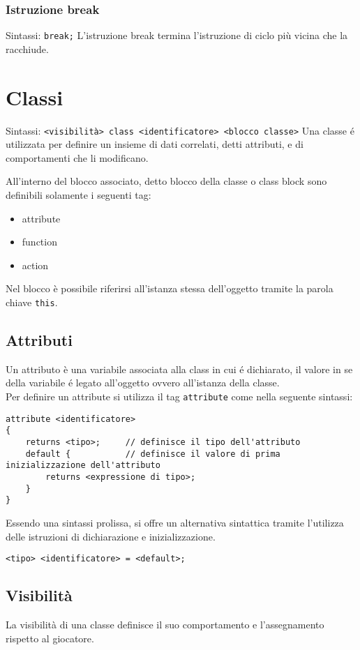 \subsubsection{Istruzione break}
Sintassi: \verb|break;|
L'istruzione break termina l'istruzione di ciclo più vicina che la racchiude.

\section{Classi}
Sintassi: \verb|<visibilità> class <identificatore> <blocco classe>|
Una classe é utilizzata per definire un insieme di dati correlati, detti attributi, e di 
comportamenti che li modificano.

All'interno del blocco associato, detto blocco della classe o class block sono definibili
solamente i seguenti tag:
\begin{itemize}
    \item attribute
    \item function
    \item action
\end{itemize}
Nel blocco è possibile riferirsi all'istanza stessa dell'oggetto tramite 
la parola chiave \verb|this|.

\subsection{Attributi}
Un attributo è una variabile associata alla class in cui é dichiarato, il valore in se della 
variabile é legato all'oggetto ovvero all'istanza della classe. \\
Per definire un attribute si utilizza il tag \verb|attribute| come nella seguente sintassi:
\begin{verbatim}
attribute <identificatore>
{
    returns <tipo>;     // definisce il tipo dell'attributo
    default {           // definisce il valore di prima inizializzazione dell'attributo
        returns <expressione di tipo>;
    }
}
\end{verbatim}
Essendo una sintassi prolissa, si offre un alternativa sintattica tramite l'utilizza
delle istruzioni di dichiarazione e inizializzazione.
\begin{verbatim}
<tipo> <identificatore> = <default>; 
\end{verbatim}

\subsection{Visibilità}
La visibilità di una classe definisce il suo comportamento e l'assegnamento rispetto al giocatore.

